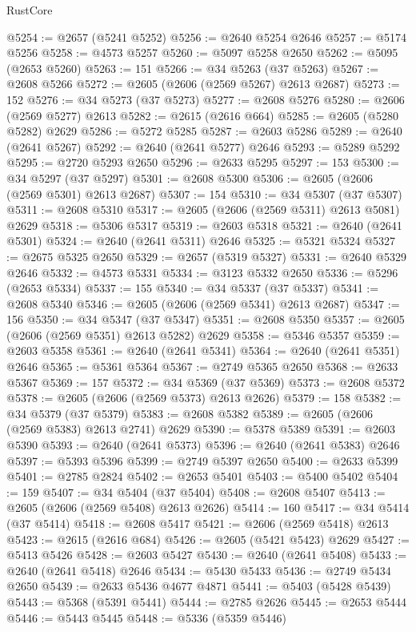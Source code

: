 \begin{lexlean}{RustCore}
\begin{coremodule}
@5254 := @2657 (@5241 @5252)
@5256 := @2640 @5254 @2646
@5257 := @5174 @5256
@5258 := @4573 @5257
@5260 := @5097 @5258 @2650
@5262 := @5095 (@2653 @5260)
@5263 := 151
@5266 := @34 @5263 (@37 @5263)
@5267 := @2608 @5266
@5272 := @2605 (@2606 (@2569 @5267) @2613 @2687)
@5273 := 152
@5276 := @34 @5273 (@37 @5273)
@5277 := @2608 @5276
@5280 := @2606 (@2569 @5277) @2613
@5282 := @2615 (@2616 @664)
@5285 := @2605 (@5280 @5282) @2629
@5286 := @5272 @5285
@5287 := @2603 @5286
@5289 := @2640 (@2641 @5267)
@5292 := @2640 (@2641 @5277) @2646
@5293 := @5289 @5292
@5295 := @2720 @5293 @2650
@5296 := @2633 @5295
@5297 := 153
@5300 := @34 @5297 (@37 @5297)
@5301 := @2608 @5300
@5306 := @2605 (@2606 (@2569 @5301) @2613 @2687)
@5307 := 154
@5310 := @34 @5307 (@37 @5307)
@5311 := @2608 @5310
@5317 := @2605 (@2606 (@2569 @5311) @2613 @5081) @2629
@5318 := @5306 @5317
@5319 := @2603 @5318
@5321 := @2640 (@2641 @5301)
@5324 := @2640 (@2641 @5311) @2646
@5325 := @5321 @5324
@5327 := @2675 @5325 @2650
@5329 := @2657 (@5319 @5327)
@5331 := @2640 @5329 @2646
@5332 := @4573 @5331
@5334 := @3123 @5332 @2650
@5336 := @5296 (@2653 @5334)
@5337 := 155
@5340 := @34 @5337 (@37 @5337)
@5341 := @2608 @5340
@5346 := @2605 (@2606 (@2569 @5341) @2613 @2687)
@5347 := 156
@5350 := @34 @5347 (@37 @5347)
@5351 := @2608 @5350
@5357 := @2605 (@2606 (@2569 @5351) @2613 @5282) @2629
@5358 := @5346 @5357
@5359 := @2603 @5358
@5361 := @2640 (@2641 @5341)
@5364 := @2640 (@2641 @5351) @2646
@5365 := @5361 @5364
@5367 := @2749 @5365 @2650
@5368 := @2633 @5367
@5369 := 157
@5372 := @34 @5369 (@37 @5369)
@5373 := @2608 @5372
@5378 := @2605 (@2606 (@2569 @5373) @2613 @2626)
@5379 := 158
@5382 := @34 @5379 (@37 @5379)
@5383 := @2608 @5382
@5389 := @2605 (@2606 (@2569 @5383) @2613 @2741) @2629
@5390 := @5378 @5389
@5391 := @2603 @5390
@5393 := @2640 (@2641 @5373)
@5396 := @2640 (@2641 @5383) @2646
@5397 := @5393 @5396
@5399 := @2749 @5397 @2650
@5400 := @2633 @5399
@5401 := @2785 @2824
@5402 := @2653 @5401
@5403 := @5400 @5402
@5404 := 159
@5407 := @34 @5404 (@37 @5404)
@5408 := @2608 @5407
@5413 := @2605 (@2606 (@2569 @5408) @2613 @2626)
@5414 := 160
@5417 := @34 @5414 (@37 @5414)
@5418 := @2608 @5417
@5421 := @2606 (@2569 @5418) @2613
@5423 := @2615 (@2616 @684)
@5426 := @2605 (@5421 @5423) @2629
@5427 := @5413 @5426
@5428 := @2603 @5427
@5430 := @2640 (@2641 @5408)
@5433 := @2640 (@2641 @5418) @2646
@5434 := @5430 @5433
@5436 := @2749 @5434 @2650
@5439 := @2633 @5436 @4677 @4871
@5441 := @5403 (@5428 @5439)
@5443 := @5368 (@5391 @5441)
@5444 := @2785 @2626
@5445 := @2653 @5444
@5446 := @5443 @5445
@5448 := @5336 (@5359 @5446)

\end{coremodule}
\end{lexlean}
